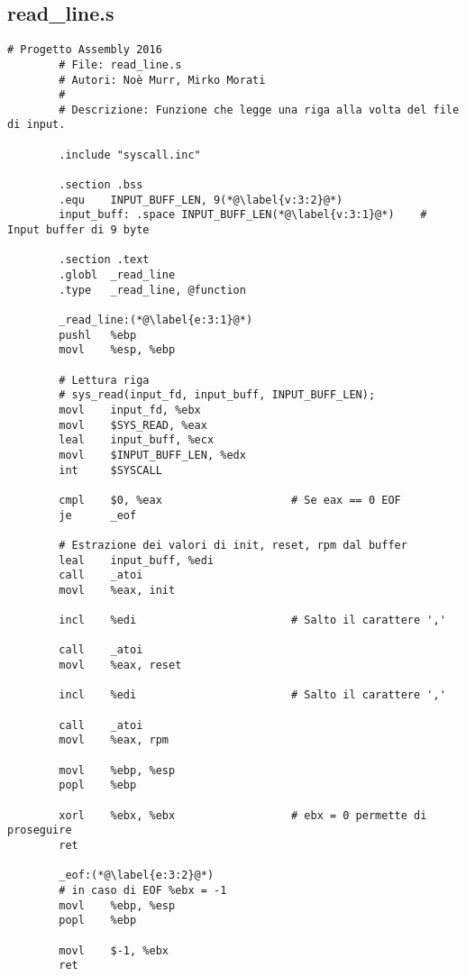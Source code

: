\documentclass[a4paper,11pt]{article}
\begin{document}
		\subsection{read\_line.s}
		\begin{lstlisting}[language=MyAssembler, style=MyAsm]
		# Progetto Assembly 2016
		# File: read_line.s
		# Autori: Noè Murr, Mirko Morati
		#
		# Descrizione: Funzione che legge una riga alla volta del file di input.
		
		.include "syscall.inc"
		
		.section .bss
		.equ	INPUT_BUFF_LEN, 9(*@\label{v:3:2}@*)
		input_buff:	.space INPUT_BUFF_LEN(*@\label{v:3:1}@*)	# Input buffer di 9 byte
		
		.section .text
		.globl 	_read_line
		.type   _read_line, @function
		
		_read_line:(*@\label{e:3:1}@*)
		pushl	%ebp
		movl 	%esp, %ebp
		
		# Lettura riga
		# sys_read(input_fd, input_buff, INPUT_BUFF_LEN);
		movl    input_fd, %ebx
		movl    $SYS_READ, %eax
		leal    input_buff, %ecx
		movl    $INPUT_BUFF_LEN, %edx
		int     $SYSCALL
		
		cmpl    $0, %eax                    # Se eax == 0 EOF
		je      _eof
		
		# Estrazione dei valori di init, reset, rpm dal buffer
		leal    input_buff, %edi
		call    _atoi
		movl    %eax, init
		
		incl    %edi						# Salto il carattere ','
		
		call    _atoi
		movl    %eax, reset
		
		incl    %edi						# Salto il carattere ','
		
		call    _atoi
		movl    %eax, rpm
		
		movl    %ebp, %esp
		popl    %ebp
		
		xorl    %ebx, %ebx					# ebx = 0 permette di proseguire
		ret
		
		_eof:(*@\label{e:3:2}@*)
		# in caso di EOF %ebx = -1
		movl    %ebp, %esp
		popl    %ebp
		
		movl    $-1, %ebx
		ret
		\end{lstlisting}
		
		\newpage
\end{document}
